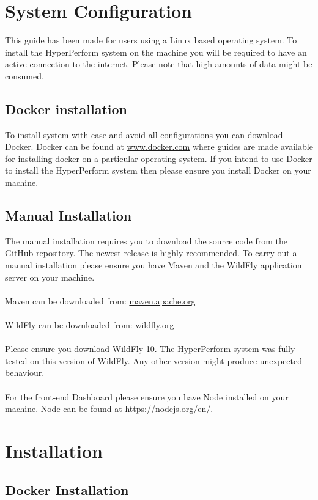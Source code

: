 \documentclass[11pt,a4paper]{article}
\begin{document}
\section{System Configuration}
This guide has been made for users using a Linux based operating system. To install the HyperPerform system on the machine you will be required to have an active connection to the internet. Please note that high amounts of data might be consumed. 

\subsection{Docker installation}
To install system with ease and avoid all configurations you can download Docker. Docker can be found at \url{www.docker.com} where guides are made available for installing docker on a particular operating system. If you intend to use Docker to install the HyperPerform system then please ensure you install Docker on your machine.

\subsection{Manual Installation}
The manual installation requires you to download the source code from the GitHub repository. The newest release is highly recommended. To carry out a manual installation please ensure you have Maven and the WildFly application server on your machine. \\ \\
Maven can be downloaded from: \url{maven.apache.org} \\ \\
WildFly can be downloaded from: \url{wildfly.org} \\ \\
Please ensure you download WildFly 10. The HyperPerform system was fully tested on this version of WildFly. Any other version might produce unexpected behaviour. \\ \\
For the front-end Dashboard please ensure you have Node installed on your machine. Node can be found at \url{https://nodejs.org/en/}.

\section{Installation}

\subsection{Docker Installation}
\end{document}
